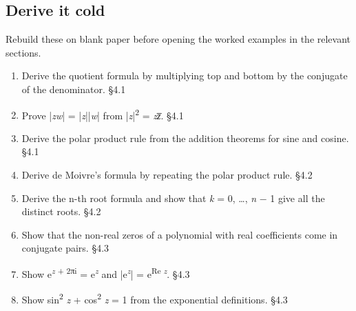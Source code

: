 \documentclass[11pt]{article}
\begin{document}
\begin{keepsection}
\section{Derive it cold}

Rebuild these on blank paper before opening the worked examples in the relevant sections.

\begin{enumerate}
\item Derive the quotient formula by multiplying top and bottom by the conjugate of the denominator. \hfill{\small\color{FAUblue}§4.1}
\item Prove |\textit{z}\textit{w}| = |\textit{z}||\textit{w}| from |\textit{z}|\textsuperscript{2} = \textit{z}\textit{z̅}. \hfill{\small\color{FAUblue}§4.1}
\item Derive the polar product rule from the addition theorems for sine and cosine. \hfill{\small\color{FAUblue}§4.1}
\item Derive de Moivre’s formula by repeating the polar product rule. \hfill{\small\color{FAUblue}§4.2}
\item Derive the n-th root formula and show that \textit{k} = 0, …, \textit{n} \ensuremath{-} 1 give all the distinct roots. \hfill{\small\color{FAUblue}§4.2}
\item Show that the non-real zeros of a polynomial with real coefficients come in conjugate pairs. \hfill{\small\color{FAUblue}§4.3}
\item Show e\textsuperscript{\textit{z} + 2πi} = e\textsuperscript{\textit{z}} and |e\textsuperscript{\textit{z}}| = e\textsuperscript{Re \textit{z}}. \hfill{\small\color{FAUblue}§4.3}
\item Show sin\textsuperscript{2} \textit{z} + cos\textsuperscript{2} \textit{z} = 1 from the exponential definitions. \hfill{\small\color{FAUblue}§4.3}
\end{enumerate}
\end{keepsection}
\end{document}
